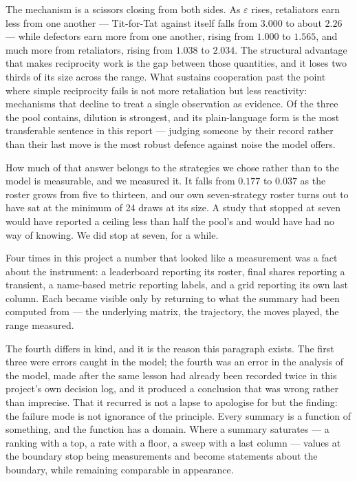 \documentclass[11pt,a4paper]{article}
\newcommand{\eps}{\varepsilon}
\begin{document}
The mechanism is a scissors closing from both sides. As $\eps$ rises, retaliators
earn less from one another --- Tit-for-Tat against itself falls from $3.000$ to
about $2.26$ --- while defectors earn more from one another, rising from $1.000$
to $1.565$, and much more from retaliators, rising from $1.038$ to $2.034$. The
structural advantage that makes reciprocity work is the gap between those
quantities, and it loses two thirds of its size across the range. What sustains
cooperation past the point where simple reciprocity fails is not more retaliation
but less reactivity: mechanisms that decline to treat a single observation as
evidence. Of the three the pool contains, dilution is strongest, and its
plain-language form is the most transferable sentence in this report --- judging
someone by their record rather than their last move is the most robust defence
against noise the model offers.

How much of that answer belongs to the strategies we chose rather than to the
model is measurable, and we measured it. It falls from $0.177$ to $0.037$ as the
roster grows from five to thirteen, and our own seven-strategy roster turns out
to have sat at the minimum of 24 draws at its size. A study that stopped at seven
would have reported a ceiling less than half the pool's and would have had no way
of knowing. We did stop at seven, for a while.

Four times in this project a number that looked like a measurement was a fact
about the instrument: a leaderboard reporting its roster, final shares reporting
a transient, a name-based metric reporting labels, and a grid reporting its own
last column. Each became visible only by returning to what the summary had been
computed from --- the underlying matrix, the trajectory, the moves played, the
range measured.

The fourth differs in kind, and it is the reason this paragraph exists. The first
three were errors caught in the model; the fourth was an error in the analysis of
the model, made after the same lesson had already been recorded twice in this
project's own decision log, and it produced a conclusion that was wrong rather
than imprecise. That it recurred is not a lapse to apologise for but the finding:
the failure mode is not ignorance of the principle. Every summary is a function
of something, and the function has a domain. Where a summary saturates --- a
ranking with a top, a rate with a floor, a sweep with a last column --- values at
the boundary stop being measurements and become statements about the boundary,
while remaining comparable in appearance.
\end{document}
